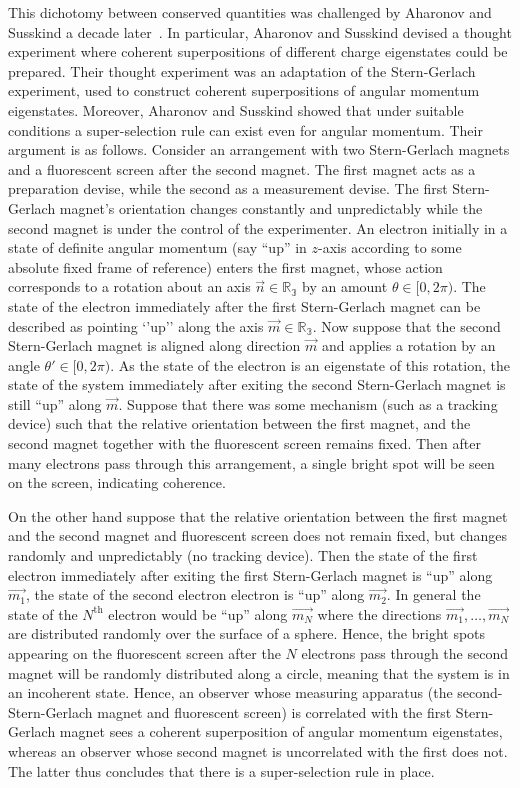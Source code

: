 \documentclass{article}
\begin{document}
This dichotomy between conserved quantities was challenged by Aharonov and Susskind a decade later~\cite{AS67}.  In particular, Aharonov and Susskind devised a thought experiment where coherent superpositions of different charge eigenstates could be prepared.  Their thought experiment was an adaptation of the Stern-Gerlach experiment, used to construct coherent superpositions of angular momentum eigenstates.  Moreover, Aharonov and Susskind showed that under suitable conditions a super-selection rule can exist even for angular momentum.  Their argument is as follows.  Consider an arrangement with  two Stern-Gerlach magnets and a fluorescent screen after the second magnet. The first magnet acts as a preparation devise, while the second as a measurement devise.  The first Stern-Gerlach magnet's orientation changes constantly and unpredictably while the second magnet is under the control of the experimenter.  An electron initially in a state of definite angular momentum (say ``up'' in $z$-axis according to some absolute fixed frame of reference) enters the first magnet, whose action corresponds to a rotation about an axis $\vec{n}\in\mathbb{R_3}$ by an amount $\theta\in[0,2\pi)$.  The state of the electron immediately after the first Stern-Gerlach magnet can be described as pointing `'up'' along  the axis $\vec{m}\in\mathbb{R_3}$.  Now suppose that the second Stern-Gerlach magnet is aligned along direction $\vec{m}$ and applies a rotation by an angle $\theta'\in[0,2\pi)$.  As the state of the electron is an eigenstate of this rotation, the state of the system immediately after exiting the second Stern-Gerlach magnet is still ``up'' along $\vec{m}$.  Suppose that there was some mechanism (such as a tracking device) such that the relative orientation between the first magnet, and the second magnet together with the fluorescent screen remains fixed.   Then after many electrons pass through this arrangement, a single bright spot will be seen on the screen, indicating coherence.

On the other hand suppose that the relative orientation between the first magnet and the second magnet and fluorescent screen does not remain fixed, but changes randomly and unpredictably (no tracking device).  Then the state of the first electron immediately after exiting the first Stern-Gerlach magnet is ``up'' along $\vec{m_1}$, the state of the second electron electron is ``up'' along $\vec{m_2}$.  In general the state of the $N^{\mathrm{th}}$ electron would be ``up'' along $\vec{m_N}$ where the directions $\vec{m_1},\ldots,\vec{m_N}$ are distributed randomly over the surface of a sphere.  Hence, the bright spots appearing on the fluorescent screen after the $N$ electrons pass through the second magnet will be randomly distributed along a circle, meaning that the system is in an incoherent state.  Hence, an observer whose measuring apparatus (the second-Stern-Gerlach magnet and fluorescent screen) is correlated with the first Stern-Gerlach magnet sees a coherent superposition of angular momentum eigenstates, whereas an observer whose second magnet is uncorrelated with the first does not.  The latter thus concludes that there is a super-selection rule in place.   
\end{document}
